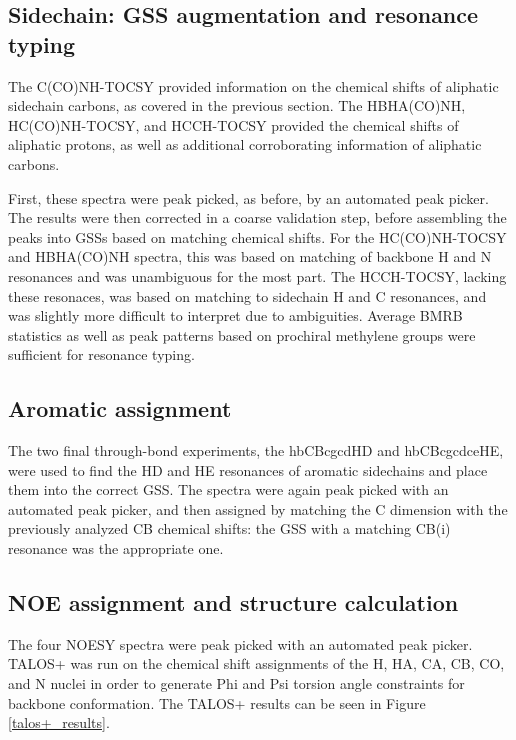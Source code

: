 \subsection*{Sidechain: GSS augmentation and resonance typing}
The C(CO)NH-TOCSY provided information on the chemical shifts of aliphatic
sidechain carbons, as covered in the previous section.  The HBHA(CO)NH, 
HC(CO)NH-TOCSY, and HCCH-TOCSY provided the chemical shifts of aliphatic
protons, as well as additional corroborating information of aliphatic carbons.

First, these spectra were peak picked, as before, by an automated peak picker.
The results were then corrected in a coarse validation step, before assembling
the peaks into GSSs based on matching chemical shifts.  For the HC(CO)NH-TOCSY
and HBHA(CO)NH spectra, this was based on matching of backbone H and N
resonances and was unambiguous for the most part.  The HCCH-TOCSY, lacking these
resonaces, was based on matching to sidechain H and C resonances, and was
slightly more difficult to interpret due to ambiguities.  
Average BMRB statistics as well as peak patterns based on prochiral methylene
groups were sufficient for resonance typing.

\subsection*{Aromatic assignment}
The two final through-bond experiments, the hbCBcgcdHD and hbCBcgcdceHE, were
used to find the HD and HE resonances of aromatic sidechains and place them
into the correct GSS.  The spectra were again peak picked with an automated
peak picker, and then assigned by matching the C dimension with the previously
analyzed CB chemical shifts: the GSS with a matching CB(i) resonance was the
appropriate one.

\subsection*{NOE assignment and structure calculation}
The four NOESY spectra were peak picked with an automated peak picker.  
TALOS+ \cite{talos+} was run on the chemical shift assignments of the H, HA,
CA, CB, CO, and N nuclei in order to generate Phi and Psi torsion angle 
constraints for backbone conformation.
The TALOS+ results can be seen in Figure \ref{talos+_results}.

